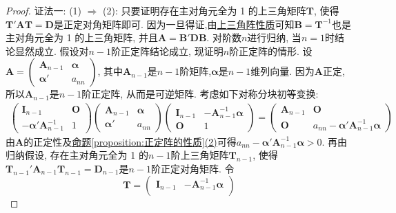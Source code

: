\documentclass[../../main.tex]{subfiles}
\begin{document}
\begin{proof}
{\color{blue}证法一:}
(1) $\Rightarrow$ (2): 只要证明存在主对角元全为 1 的上三角矩阵$\boldsymbol{T}$, 使得$\boldsymbol{T}'\boldsymbol{A}\boldsymbol{T}=\boldsymbol{D}$是正定对角矩阵即可. 因为一旦得证,由\hyperref[proposition:上三角阵性质]{上三角阵性质}可知$\boldsymbol{B}=\boldsymbol{T}^{-1}$也是主对角元全为 1 的上三角矩阵, 并且$\boldsymbol{A}=\boldsymbol{B}'\boldsymbol{D}\boldsymbol{B}$. 对阶数$n$进行归纳, 当$n = 1$时结论显然成立. 假设对$n - 1$阶正定阵结论成立, 现证明$n$阶正定阵的情形. 设$\boldsymbol{A}=\begin{pmatrix}
\boldsymbol{A}_{n - 1} & \boldsymbol{\alpha} \\
\boldsymbol{\alpha}' & a_{nn}
\end{pmatrix}$, 其中$\boldsymbol{A}_{n - 1}$是$n - 1$阶矩阵,$\boldsymbol{\alpha}$是$n - 1$维列向量. 因为$\boldsymbol{A}$正定, 所以$\boldsymbol{A}_{n - 1}$是$n - 1$阶正定阵, 从而是可逆矩阵. 考虑如下对称分块初等变换:
\begin{align*}
\begin{pmatrix}
\boldsymbol{I}_{n - 1} & \boldsymbol{O} \\
-\boldsymbol{\alpha}'\boldsymbol{A}_{n - 1}^{-1} & 1
\end{pmatrix}
\begin{pmatrix}
\boldsymbol{A}_{n - 1} & \boldsymbol{\alpha} \\
\boldsymbol{\alpha}' & a_{nn}
\end{pmatrix}
\begin{pmatrix}
\boldsymbol{I}_{n - 1} & -\boldsymbol{A}_{n - 1}^{-1}\boldsymbol{\alpha} \\
\boldsymbol{O} & 1
\end{pmatrix}
=
\begin{pmatrix}
\boldsymbol{A}_{n - 1} & \boldsymbol{O} \\
\boldsymbol{O} & a_{nn}-\boldsymbol{\alpha}'\boldsymbol{A}_{n - 1}^{-1}\boldsymbol{\alpha}
\end{pmatrix}
\end{align*}
由$\boldsymbol{A}$的正定性及\hyperref[proposition:正定阵的性质]{命题\ref{proposition:正定阵的性质}(2)}可得$a_{nn}-\boldsymbol{\alpha}'\boldsymbol{A}_{n - 1}^{-1}\boldsymbol{\alpha}>0$. 再由归纳假设, 存在主对角元全为 1 的$n - 1$阶上三角矩阵$\boldsymbol{T}_{n - 1}$, 使得$\boldsymbol{T}_{n - 1}'\boldsymbol{A}_{n - 1}\boldsymbol{T}_{n - 1}=\boldsymbol{D}_{n - 1}$是$n - 1$阶正定对角矩阵. 令
\[
\boldsymbol{T}=\begin{pmatrix}
\boldsymbol{I}_{n - 1} & -\boldsymbol{A}_{n - 1}^{-1}\boldsymbol{\alpha} \\

\end{pmatrix}\]
\end{proof}
\end{document}
